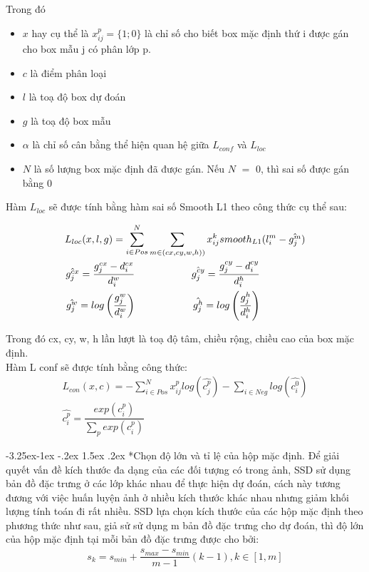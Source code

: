 \documentclass[a4paper]{report}
\makeatletter
\newcounter {subsubsubsection}[subsubsection]
\newcommand\subsubsubsection{\@startsection{subsubsubsection}{4}{\z@}%
                                     {-3.25ex\@plus -1ex \@minus -.2ex}%
                                     {1.5ex \@plus .2ex}%
                                     {\normalfont\normalsize\bfseries}}
\makeatother
\begin{document}
Trong đó

\begin{itemize}
	\item $x$ hay cụ thể là $x_{ij}^p = \{1; 0 \}$ là chỉ số cho biết box mặc định thứ i được gán cho
	box mẫu j có phân lớp p.
	\item $c$ là điểm phân loại
	\item $l$ là toạ độ box dự đoán
	\item $g$ là toạ độ box mẫu
	\item $\alpha$ là chỉ số cân bằng thể hiện quan hệ giữa $L_{conf}$ và $L_{loc}$
	\item $N$ là số lượng box mặc định đã được gán. Nếu $N$ $=$ $0$, thì sai số được gán bằng
	0
\end{itemize}

Hàm $L_{loc}$ sẽ được tính bằng hàm sai số Smooth L1 theo công thức cụ thể sau:

\begin{align} 
		L_{loc}(x, l, g) = \sum_{i \in Pos}^N  \sum_{m \in (cx,cy,w,h))} x_{ij}^ksmooth_{L1}(l_i^m-\hat{g_j^m}) \\
		\hat{g_j^{cx}} = \dfrac{g_j^{cx}-d_i^{cx}}{d_i^w} \hspace{2cm} \hat{g_j^{cy}} = \dfrac{g_j^{cy}-d_i^{cy}}{d_i^h} \hspace{1.6cm}\\
		\hat{g_j^{w}} = log \left (\dfrac{g_j^{w}}{d_i^w} \right ) \hspace{2cm} \hat{g_j^{h}} = log \left (\dfrac{g_j^{h}}{d_i^h} \right ) \hspace{1.6cm}
\end{align} 

Trong đó cx, cy, w, h lần lượt là toạ độ tâm, chiều rộng, chiều cao của box mặc định. \\
Hàm L conf sẽ được tính bằng công thức:
\begin{align} 
		L_{con}(x, c) = - \sum_{i \in Pos}^N x_{ij}^plog(\hat{c_j^p}) - \sum_{i \in Neg} log(\hat{c_i^0}) \\
		\hat{c_i^p} = \dfrac{exp(c_i^p)}{\sum_p exp (c_i^p)} \hspace{2cm}
\end{align}

\subsubsubsection*{Chọn độ lớn và tỉ lệ của hộp mặc định. }
Để giải quyết vấn đề kích thước đa dạng của các đối tượng có trong ảnh, SSD sử dụng bản đồ đặc trưng ở các lớp khác nhau để thực hiện dự đoán, cách này tương đương với việc huấn luyện ảnh ở nhiều kích thước khác nhau nhưng giảm khối lượng tính toán đi rất nhiều. SSD lựa chọn kích thước của các hộp mặc định theo phương thức như sau, giả sử sử dụng m bản đồ đặc trưng cho dự đoán, thì độ lớn của hộp mặc định tại mỗi bản đồ đặc trưng được cho bởi:\\
\begin{align}
	s_k = s_{min} + \dfrac{s_{max} - s_{min}}{m-1} (k-1), k \in [1, m]
\end{align}
\end{document}
